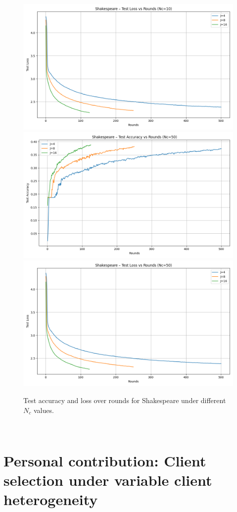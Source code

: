 \documentclass[10pt,twocolumn,letterpaper]{article}
\begin{document}
\begin{figure}[H]
    \includegraphics[width=0.45\linewidth]{shak_figs/shakespeare_loss_vs_rounds_10.png}
    \includegraphics[width=0.45\linewidth]{shak_figs/shakespeare_acc_vs_rounds_50.png}
    \includegraphics[width=0.45\linewidth]{shak_figs/shakespeare_loss_vs_rounds_50.png}
    
    \caption{Test accuracy and loss over rounds for Shakespeare under different $N_c$ values.}
\end{figure}








\vspace{1mm}








\


















\section{Personal contribution: Client selection under variable client heterogeneity}
\label{sec:personal}
\end{document}
